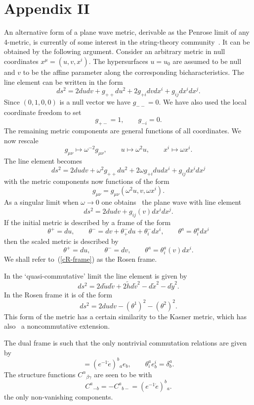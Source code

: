 \documentclass[12pt,a4paper]{article}
\newcounter{eg}
\def\t#1{\tilde #1}
\newcommand{\initiate}{\setcounter{equation}{0}}
\begin{document}
\initiate
\section*{Appendix II}
\setcounter{section}{2}

An alternative form of a plane wave metric, derivable as the Penrose
limit of any 4-metric, is currently of some interest in the
string-theory community~\cite{BlaFigHulPap02}. It can be obtained by
the following argument.  Consider an arbitrary metric in null
coordinates $x^\mu = (u,v,x^i)$. The hypersurfaces $u = u_0$ are
assumed to be null and $v$ to be the affine parameter along the
corresponding bicharacteristics.  The line element can be written in
the form
$$
ds^2 = 2 du dv + g_{++} du^2 + 
2 g_{+i} dv dx^i + g_{ij} dx^i dx^j.
$$
Since $(0,1,0,0)$ is a null vector we have $g_{--} = 0$. We have
also used the local coordinate freedom to set
$$
g_{+-} = 1, \qquad g_{-i} = 0.
$$
The remaining metric components are general functions of all
coordinates. We now rescale
$$
g_{\mu\nu} \mapsto \omega^{-2} g_{\mu\nu}, \qquad
u \mapsto \omega^2 u, \qquad x^i \mapsto \omega x^i.
$$
The line element becomes
$$
ds^2 = 2 du dv + \omega^2 g_{++} du^2 + 
2 \omega g_{+i} du dx^i + g_{ij} dx^i dx^j
$$
with the metric components now functions of the form
$$
g_{\mu\nu} = g_{\mu\nu}(\omega^2 u, v, \omega x^i).
$$
As a singular limit when $\omega \to 0$ one
obtains~\cite{Pen76,BlaFigHulPap02} the plane wave with line element 
$$
ds^2 = 2 du dv + g_{ij}(v) dx^i dx^j.
$$
If the initial metric is described by a frame of the form
$$
\theta^+ = du, \qquad
\theta^- = dv + \theta^-_+ du +  \theta^-_i dx^i,\qquad 
\theta^a =  \theta^a_i dx^i
$$
then the scaled metric is described by
\begin{equation}
\theta^+ = du, \qquad
\theta^- = dv, \qquad \theta^a =  
\theta^a_i(v) dx^i.                         \label{cR-frame}
\end{equation}
We shall refer to~(\ref{cR-frame}) as the Rosen frame. 

In the `quasi-commutative' limit the line element is given by
$$
ds^2 = 2d\t{u} d\t{v} + 2\t{h} d\t{v}^2 - d\t{x}^2 - d\t{y}^2.
$$
In the Rosen frame it is of the form
$$
ds^2 = 2du dv - (\theta^1)^2 - (\theta^2)^2.
$$
This form of the metric has a certain similarity to the Kasner
metric, which has also~\cite{MacMadZou02} a noncommutative extension.

The dual frame is such that the only nontrivial commutation
relations are given by
\begin{equation}
[e_-, e_a] =   (e^{-1} \dot e)^b{}_a e_b, \qquad 
\theta^a_i e^i_b = \delta^a_b.                                   \label{crs}
\end{equation}
The structure functions $C^\alpha{}_{\beta\gamma}$ are seen to be with
$$
C^a{}_{-b} = - C^a{}_{b-} = (e^{-1} \dot e)^b{}_a. 
$$
the only non-vanishing components.
\end{document}
